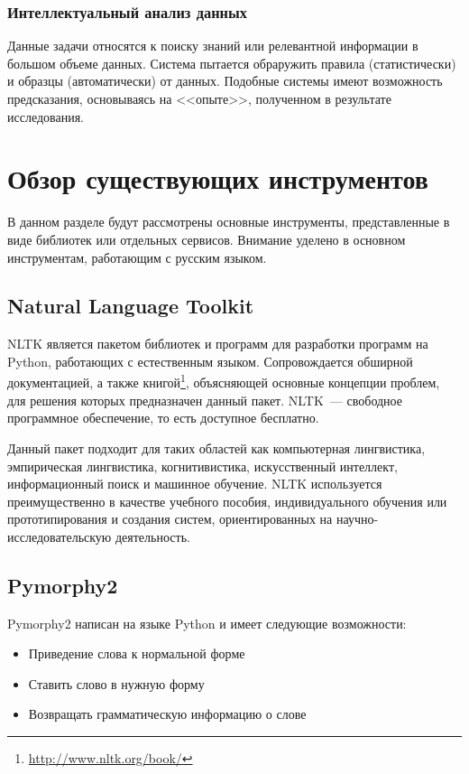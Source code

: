 \documentclass[14pt]{matmex-diploma-custom}
\begin{document}
\subsubsection{Интеллектуальный анализ данных}

Данные задачи относятся к поиску знаний или релевантной информации в большом объеме данных. Система пытается обраружить правила (статистически) и образцы (автоматически) от данных. Подобные системы имеют возможность предсказания, основываясь на <<опыте>>, полученном в результате исследования.

\clearpage\section{Обзор существующих инструментов}

В данном разделе будут рассмотрены основные инструменты, представленные в виде библиотек или отдельных сервисов. Внимание уделено в основном инструментам, работающим с русским языком.

\subsection{Natural Language Toolkit}

NLTK\cite{tools:nltk} является пакетом библиотек и программ для разработки программ на Python, работающих с естественным языком. Сопровождается обширной документацией, а также книгой\footnote{\url{http://www.nltk.org/book/}}, объясняющей основные концепции проблем, для решения которых предназначен данный пакет. NLTK~--- свободное программное обеспечение, то есть доступное бесплатно.

Данный пакет подходит для таких областей как компьютерная лингвистика, эмпирическая лингвистика, когнитивистика, искусственный интеллект, информационный поиск и машинное обучение. NLTK используется преимущественно в качестве учебного пособия, индивидуального обучения или прототипирования и создания систем, ориентированных на научно-исследовательскую деятельность.

\subsection{Pymorphy2}

Pymorphy2\cite{tools:pymorphy2} написан на языке Python и имеет следующие возможности:

\begin{itemize}

\item Приведение слова к нормальной форме

\item Ставить слово в нужную форму

\item Возвращать грамматическую информацию о слове

\end{itemize}
\end{document}
